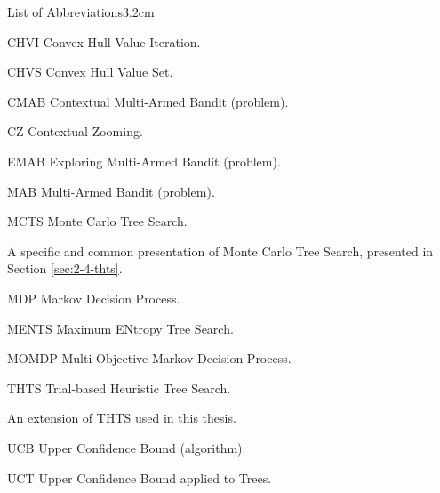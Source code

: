 \begin{mclistof}{List of Abbreviations}{3.2cm}
    \item[CHVI] Convex Hull Value Iteration.
    \item[CHVS] Convex Hull Value Set.
    \item[CMAB] Contextual Multi-Armed Bandit (problem).
    \item[CZ] Contextual Zooming. 
    \item[EMAB] Exploring Multi-Armed Bandit (problem).
    \item[MAB] Multi-Armed Bandit (problem). 
    \item[MCTS] Monte Carlo Tree Search.
    \item[\mctsone] A specific and common presentation of Monte Carlo Tree Search, presented in Section \ref{sec:2-4-thts}.
    \item[MDP] Markov Decision Process.
    \item[MENTS] Maximum ENtropy Tree Search.
    \item[MOMDP] Multi-Objective Markov Decision Process.
    \item[THTS] Trial-based Heuristic Tree Search.
    \item[\thtspp] An extension of THTS used in this thesis.
    \item[UCB] Upper Confidence Bound (algorithm).
    \item[UCT] Upper Confidence Bound applied to Trees.
\end{mclistof} 


